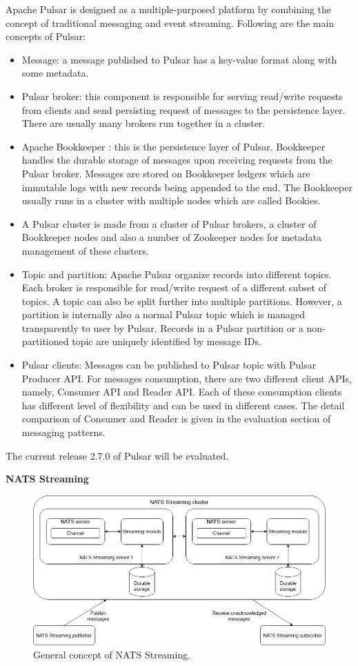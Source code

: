 Apache Pulsar is designed as a multiple-purposed platform by combining the concept of traditional messaging and event streaming. Following are the main concepts of Pulsar:
\begin{itemize}
	\item Message: a message published to Pulsar has a key-value format along with some metadata.
	\item Pulsar broker: this component is responsible for serving read/write requests from clients and send persisting request of messages to the persistence layer. There are usually many brokers run together in a cluster.
	\item Apache Bookkeeper \cite{apachebookkeeper}: this is the persistence layer of Pulsar. Bookkeeper handles the durable storage of messages upon receiving requests from the Pulsar broker. Messages are stored on Bookkeeper ledgers which are immutable logs with new records being appended to the end. The Bookkeeper usually runs in a cluster with multiple nodes which are called Bookies. 
	\item A Pulsar cluster is made from a cluster of Pulsar brokers, a cluster of Bookkeeper nodes and also a number of Zookeeper nodes for metadata management of these clusters.
	\item Topic and partition: Apache Pulsar organize records into different topics. Each broker is responsible for read/write request of a different subset of topics. A topic can also be split further into multiple partitions. However, a partition is internally also a normal Pulsar topic which is managed transparently to user by Pulsar. Records in a Pulsar partition or a non-partitioned topic are uniquely identified by message IDs.
	\item Pulsar clients: Messages can be published to Pulsar topic with Pulsar Producer API. For messages consumption, there are two different client APIs, namely, Consumer API and Reader API. Each of these consumption clients has different level of flexibility and can be used in different cases. The detail comparison of Consumer and Reader is given in the evaluation section of messaging patterns.
\end{itemize}

The current release 2.7.0 of Pulsar will be evaluated.

\textbf{NATS Streaming}
\begin{figure}[h]
	\centering
	\includegraphics[width=12cm]{images/general-nats.png}
	\caption{General concept of NATS Streaming.}
	\label{fig:natsgeneral}
\end{figure}

